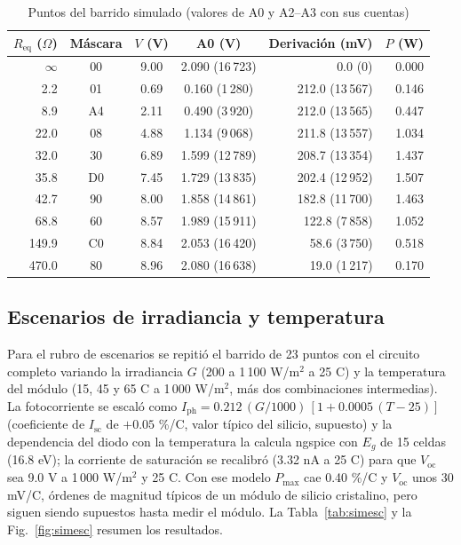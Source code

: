 \documentclass[10pt,letterpaper,twocolumn]{article}
\begin{document}
\begin{table}[t]
\centering
\caption{Puntos del barrido simulado (valores de A0 y A2--A3 con sus cuentas)}
\label{tab:simres}
\footnotesize
\begin{tabular}{@{}rcccrr@{}}
\toprule
$R_\mathrm{eq}$ ($\Omega$) & Máscara & $V$ (V) & A0 (V) & Derivación (mV) & $P$ (W)\\
\midrule
$\infty$ & 00 & 9.00 & 2.090 (16\,723) & 0.0 (0) & 0.000\\
2.2 & 01 & 0.69 & 0.160 (1\,280) & 212.0 (13\,567) & 0.146\\
8.9 & A4 & 2.11 & 0.490 (3\,920) & 212.0 (13\,565) & 0.447\\
22.0 & 08 & 4.88 & 1.134 (9\,068) & 211.8 (13\,557) & 1.034\\
32.0 & 30 & 6.89 & 1.599 (12\,789) & 208.7 (13\,354) & 1.437\\
35.8 & D0 & 7.45 & 1.729 (13\,835) & 202.4 (12\,952) & 1.507\\
42.7 & 90 & 8.00 & 1.858 (14\,861) & 182.8 (11\,700) & 1.463\\
68.8 & 60 & 8.57 & 1.989 (15\,911) & 122.8 (7\,858) & 1.052\\
149.9 & C0 & 8.84 & 2.053 (16\,420) & 58.6 (3\,750) & 0.518\\
470.0 & 80 & 8.96 & 2.080 (16\,638) & 19.0 (1\,217) & 0.170\\
\bottomrule
\end{tabular}
\end{table}

\subsection{Escenarios de irradiancia y temperatura}
Para el rubro de escenarios se repitió el barrido de 23 puntos con el circuito completo variando la irradiancia $G$ (200 a 1\,100 W/m$^2$ a 25 \textdegree C) y la temperatura del módulo (15, 45 y 65 \textdegree C a 1\,000 W/m$^2$, más dos combinaciones intermedias). La fotocorriente se escaló como $I_\mathrm{ph}=0.212\,(G/1000)\,[1+0.0005\,(T-25)]$ (coeficiente de $I_\mathrm{sc}$ de $+0.05$ \%/\textdegree C, valor típico del silicio, supuesto) y la dependencia del diodo con la temperatura la calcula ngspice con $E_g$ de 15 celdas (16.8 eV); la corriente de saturación se recalibró (3.32 nA a 25 \textdegree C) para que $V_\mathrm{oc}$ sea 9.0 V a 1\,000 W/m$^2$ y 25 \textdegree C. Con ese modelo $P_\mathrm{max}$ cae 0.40 \%/\textdegree C y $V_\mathrm{oc}$ unos 30 mV/\textdegree C, órdenes de magnitud típicos de un módulo de silicio cristalino, pero siguen siendo supuestos hasta medir el módulo. La Tabla~\ref{tab:simesc} y la Fig.~\ref{fig:simesc} resumen los resultados.
\end{document}
